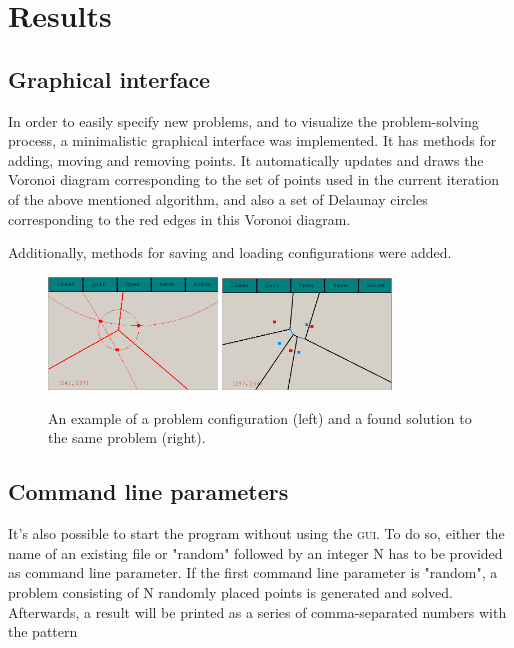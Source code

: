 \documentclass[a4paper,12pt]{article}
\begin{document}
\section{Results}

\subsection{Graphical interface}
In order to easily specify new problems, and to visualize the problem-solving process, a minimalistic graphical interface was implemented. It has methods for adding, moving and removing points. It automatically updates and draws the Voronoi diagram corresponding to the set of points used in the current iteration of the above mentioned algorithm, and also a set of Delaunay circles corresponding to the red edges in this Voronoi diagram.

Additionally, methods for saving and loading configurations were added.

\begin{figure}[h]
\includegraphics[width=0.4\textwidth]{pictures/gui.png}
\includegraphics[width=0.4\textwidth]{pictures/guisolved.png}
 \caption[Close up of \textit{Hemidactylus} sp.]
   {An example of a problem configuration (left) and a found solution to the same problem (right).}
\end{figure}


\subsection{Command line parameters}

It's also possible to start the program without using the \textsc{gui}. To do so, either the name of an existing file or "random" followed by an integer N has to be provided as command line parameter. If the first command line parameter is "random", a problem consisting of N randomly placed points is generated and solved. Afterwards, a result will be printed as a series of comma-separated numbers with the pattern
\end{document}
